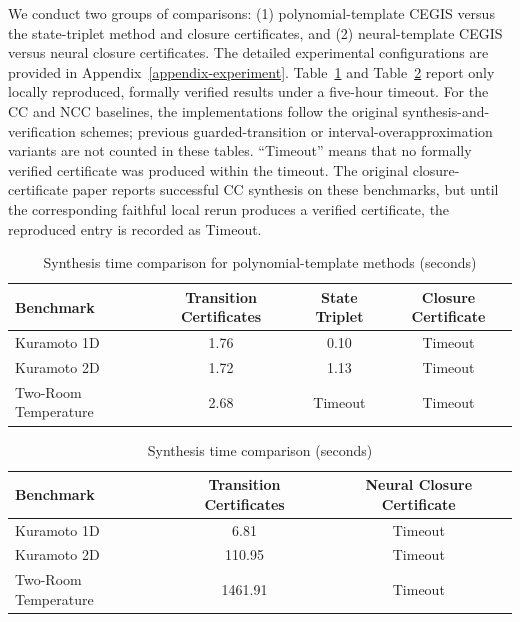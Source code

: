 We conduct two groups of comparisons: (1) polynomial-template CEGIS versus the state-triplet method and closure certificates, and (2) neural-template CEGIS versus neural closure certificates. The detailed experimental configurations are provided in Appendix~\ref{appendix-experiment}. Table~\ref{tab:results-poly} and Table~\ref{tab:results-neural} report only locally reproduced, formally verified results under a five-hour timeout. For the CC and NCC baselines, the implementations follow the original synthesis-and-verification schemes; previous guarded-transition or interval-overapproximation variants are not counted in these tables. ``Timeout'' means that no formally verified certificate was produced within the timeout. The original closure-certificate paper reports successful CC synthesis on these benchmarks, but until the corresponding faithful local rerun produces a verified certificate, the reproduced entry is recorded as Timeout.

\begin{table}[t]
\centering
\caption{Synthesis time comparison for polynomial-template methods (seconds)}
\label{tab:results-poly}
\begin{tabular}{lccc}
\hline
\textbf{Benchmark} & \textbf{Transition Certificates} & \textbf{State Triplet} & \textbf{Closure Certificate} \\
\hline
Kuramoto 1D & 1.76 & 0.10 & Timeout \\
Kuramoto 2D & 1.72 & 1.13 & Timeout \\
Two-Room Temperature & 2.68 & Timeout & Timeout \\
\hline
\end{tabular}
\end{table}
\begin{table}[t]
\centering
\caption{Synthesis time comparison (seconds)}
\label{tab:results-neural}
\begin{tabular}{lcc}
\hline
\textbf{Benchmark} & \textbf{Transition Certificates} & \textbf{Neural Closure Certificate} \\
\hline
Kuramoto 1D & 6.81 & Timeout \\
Kuramoto 2D & 110.95 & Timeout \\
Two-Room Temperature & 1461.91 & Timeout \\
\hline
\end{tabular}
\end{table}
